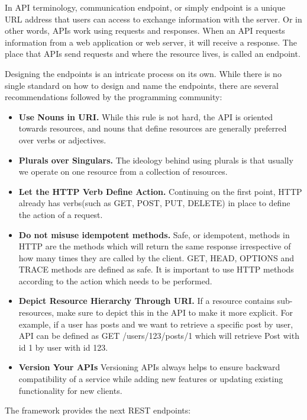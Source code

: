 \documentclass[thesis=M,english,hidelinks]{FITthesis}[2019/12/23]
\begin{document}
In \gls{API} terminology, communication endpoint, or simply endpoint is a unique URL address that users can access to exchange information with the server. Or in other words, APIs work using requests and responses. When an API requests information from a web application or web server, it will receive a response. The place that APIs send requests and where the resource lives, is called an endpoint. 

Designing the endpoints is an intricate process on its own. While there is no single standard on how to design and name the endpoints, there are several recommendations followed by the programming community\cite{REST_Design}:

\begin{itemize}
	\item \textbf{Use Nouns in URI.} While this rule is not hard, the API is oriented towards resources, and nouns that define resources are generally preferred over verbs or adjectives.
	\item \textbf{Plurals over Singulars.} The ideology behind using plurals is that usually we operate on one resource from a collection of resources.
	\item \textbf{Let the HTTP Verb Define Action.} Continuing on the first point, HTTP already has verbs(such as GET, POST, PUT, DELETE) in place to define the action of a request.
	\item \textbf{Do not misuse idempotent methods.} Safe, or idempotent, methods in HTTP are the methods which will return the same response irrespective of how many times they are called by the client. GET, HEAD, OPTIONS and TRACE methods are defined as safe. It is important to use HTTP methods according to the action which needs to be performed.
	\item \textbf{Depict Resource Hierarchy Through URI.} If a resource contains sub-resources, make sure to depict this in the API to make it more explicit. For example, if a user has posts and we want to retrieve a specific post by user, API can be defined as GET /users/123/posts/1 which will retrieve Post with id 1 by user with id 123.
	\item \textbf{Version Your APIs} Versioning APIs always helps to ensure backward compatibility of a service while adding new features or updating existing functionality for new clients.
\end{itemize}

The framework provides the next \gls{REST} endpoints:
\end{document}
